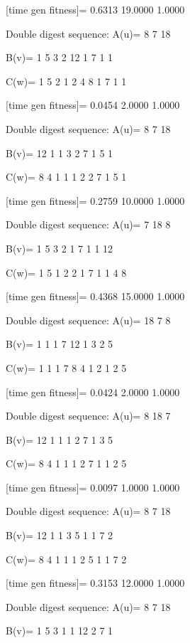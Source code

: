 [time gen fitness]=
    0.6313   19.0000    1.0000

Double digest sequence:
A(u)=
     8     7    18

B(v)=
     1     5     3     2    12     1     7     1     1

C(w)=
     1     5     2     1     2     4     8     1     7     1     1

[time gen fitness]=
    0.0454    2.0000    1.0000

Double digest sequence:
A(u)=
     8     7    18

B(v)=
    12     1     1     3     2     7     1     5     1

C(w)=
     8     4     1     1     1     2     2     7     1     5     1

[time gen fitness]=
    0.2759   10.0000    1.0000

Double digest sequence:
A(u)=
     7    18     8

B(v)=
     1     5     3     2     1     7     1     1    12

C(w)=
     1     5     1     2     2     1     7     1     1     4     8

[time gen fitness]=
    0.4368   15.0000    1.0000

Double digest sequence:
A(u)=
    18     7     8

B(v)=
     1     1     1     7    12     1     3     2     5

C(w)=
     1     1     1     7     8     4     1     2     1     2     5

[time gen fitness]=
    0.0424    2.0000    1.0000

Double digest sequence:
A(u)=
     8    18     7

B(v)=
    12     1     1     1     2     7     1     3     5

C(w)=
     8     4     1     1     1     2     7     1     1     2     5

[time gen fitness]=
    0.0097    1.0000    1.0000

Double digest sequence:
A(u)=
     8     7    18

B(v)=
    12     1     1     3     5     1     1     7     2

C(w)=
     8     4     1     1     1     2     5     1     1     7     2

[time gen fitness]=
    0.3153   12.0000    1.0000

Double digest sequence:
A(u)=
     8     7    18

B(v)=
     1     5     3     1     1    12     2     7     1

